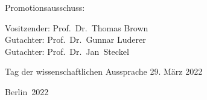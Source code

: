 \documentclass[a4paper,twoside,12pt,openright]{book}
\begin{document}
		\begin{flushleft}
		Promotionsausschuss:
		
				
		\qquad Vositzender: Prof.\ Dr.\ Thomas Brown\\
		\qquad Gutachter: Prof.\ Dr.\ Gunnar Luderer\\
		\qquad Gutachter: Prof.\ Dr.\ Jan\ Steckel\\

		

%		     
		\end{flushleft}
		\vspace*{\fill}
		Tag der wissenschaftlichen Aussprache 29. März 2022
		\begin{center}
		Berlin\ 2022\\
		\end{center}



\cleardoublepage
\fancyhead[LE,RO]{\bfseries\thepage}
\setcounter{tocdepth}{2} %
\tableofcontents

\mainmatter

\fancyhead[LE,RO]{\bfseries\thepage}
{}


\cleardoublepage
\fancyhead[LE,RO]{\bfseries\thepage}
{}

\end{document}
